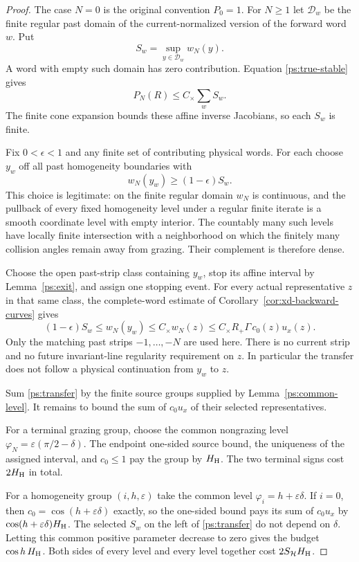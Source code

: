 \begin{proof}
The case $N=0$ is the original convention $P_0=1$.
For $N\ge1$ let $\mathcal D_w$ be the finite regular past domain
of the current-normalized version of the forward word $w$.
Put
\[
 S_w=\sup_{y\in\mathcal D_w}w_N(y).
\]
A word with empty such domain has zero contribution.  Equation
\eqref{ps:true-stable} gives
\begin{equation}\label{ps:reduce-sup}
       P_N(R)\le C_\times\sum_w S_w.
\end{equation}
The finite cone expansion bounds these affine inverse Jacobians,
so each $S_w$ is finite.

Fix $0<\epsilon<1$ and any finite set of contributing physical
words.  For each choose $y_w$ off all past homogeneity boundaries
with
\[
                    w_N(y_w)\ge(1-\epsilon)S_w .
\]
This choice is legitimate: on the finite regular domain $w_N$
is continuous, and the pullback of every fixed homogeneity
level under a regular finite iterate is a smooth coordinate
level with empty interior.  The countably many such levels
have locally finite intersection with a neighborhood on which
the finitely many collision angles remain away from grazing.
Their complement is therefore dense.

Choose the open past-strip class containing $y_w$, stop its
affine interval by Lemma~\ref{ps:exit}, and assign one stopping
event.  For every actual representative $z$ in that same class,
the complete-word estimate of
Corollary~\ref{cor:xd-backward-curves} gives
\begin{equation}\label{ps:transfer}
 (1-\epsilon)S_w\le w_N(y_w)\le C_\times w_N(z)
                \le C_\times R_+\Gamma\,c_0(z)u_x(z).
\end{equation}
Only the matching past strips $-1,\ldots,-N$ are used here.
There is no current strip and no future invariant-line
regularity requirement on $z$.  In particular the transfer
does not follow a physical continuation from $y_w$ to $z$.

Sum \eqref{ps:transfer} by the finite source groups supplied by
Lemma~\ref{ps:common-level}.  It remains to bound the sum of
$c_0u_x$ of their selected representatives.

For a terminal grazing group, choose the common nongrazing
level $\varphi_N=\varepsilon(\pi/2-\delta)$.
The endpoint one-sided source bound, the uniqueness of the
assigned interval, and $c_0\le1$ pay the group by $H_{\rm H}$.
The two terminal signs cost $2H_{\rm H}$ in total.

For a homogeneity group $(i,h,\varepsilon)$ take the common
level $\varphi_i=h+\varepsilon\delta$.
If $i=0$, then $c_0=\cos(h+\varepsilon\delta)$ exactly, so the
one-sided bound pays its sum of $c_0u_x$ by
$\cos(h+\varepsilon\delta)H_{\rm H}$.
The selected $S_w$ on the left of \eqref{ps:transfer} do not
depend on $\delta$.  Letting this common positive parameter
decrease to zero gives the budget $\cos h\,H_{\rm H}$.
Both sides of every level and every level together cost
$2S_{\mathcal H}H_{\rm H}$.


\end{proof}
